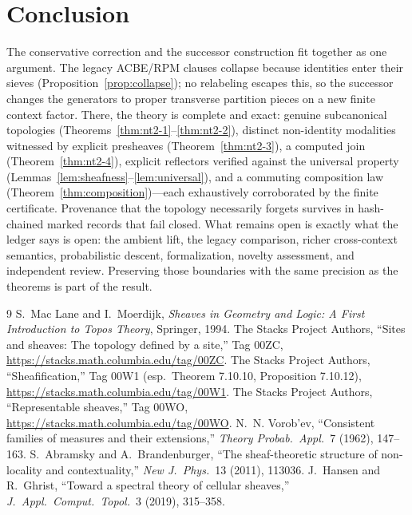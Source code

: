 \documentclass[11pt]{amsart}
\theoremstyle{definition}
\theoremstyle{remark}
\begin{document}
\section{Conclusion}

The conservative correction and the successor construction fit together as one argument. The legacy ACBE/RPM clauses collapse because identities enter their sieves (Proposition~\ref{prop:collapse}); no relabeling escapes this, so the successor changes the generators to proper transverse partition pieces on a new finite context factor. There, the theory is complete and exact: genuine subcanonical topologies (Theorems~\ref{thm:nt2-1}--\ref{thm:nt2-2}), distinct non-identity modalities witnessed by explicit presheaves (Theorem~\ref{thm:nt2-3}), a computed join (Theorem~\ref{thm:nt2-4}), explicit reflectors verified against the universal property (Lemmas~\ref{lem:sheafness}--\ref{lem:universal}), and a commuting composition law (Theorem~\ref{thm:composition})---each exhaustively corroborated by the finite certificate. Provenance that the topology necessarily forgets survives in hash-chained marked records that fail closed. What remains open is exactly what the ledger says is open: the ambient lift, the legacy comparison, richer cross-context semantics, probabilistic descent, formalization, novelty assessment, and independent review. Preserving those boundaries with the same precision as the theorems is part of the result.

\begin{thebibliography}{9}
 S.~Mac Lane and I.~Moerdijk, \emph{Sheaves in Geometry and Logic: A First Introduction to Topos Theory}, Springer, 1994.
 The Stacks Project Authors, ``Sites and sheaves: The topology defined by a site,'' Tag 00ZC, \url{https://stacks.math.columbia.edu/tag/00ZC}.
 The Stacks Project Authors, ``Sheafification,'' Tag 00W1 (esp.\ Theorem 7.10.10, Proposition 7.10.12), \url{https://stacks.math.columbia.edu/tag/00W1}.
 The Stacks Project Authors, ``Representable sheaves,'' Tag 00WO, \url{https://stacks.math.columbia.edu/tag/00WO}.
 N.~N. Vorob'ev, ``Consistent families of measures and their extensions,'' \emph{Theory Probab.\ Appl.}\ 7 (1962), 147--163.
 S.~Abramsky and A.~Brandenburger, ``The sheaf-theoretic structure of non-locality and contextuality,'' \emph{New J.\ Phys.}\ 13 (2011), 113036.
 J.~Hansen and R.~Ghrist, ``Toward a spectral theory of cellular sheaves,'' \emph{J.\ Appl.\ Comput.\ Topol.}\ 3 (2019), 315--358.
\end{thebibliography}
\end{document}
